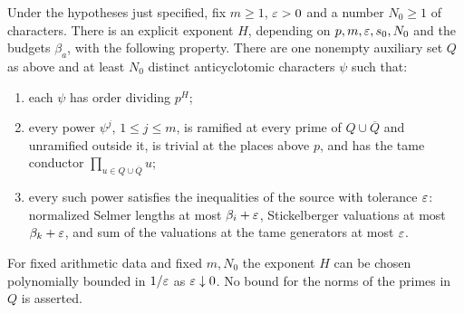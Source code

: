\begin{theorem}\label{tors:thm:arith}
Under the hypotheses just specified, fix $m\ge1$, $\varepsilon>0$ and a number $N_0\ge1$ of
characters. There is an explicit exponent $H$, depending on $p,m,\varepsilon,s_0,N_0$ and the
budgets $\beta_a$, with the following property. There are one nonempty auxiliary set $Q$
as above and at least $N_0$ distinct anticyclotomic characters $\psi$ such that:
\begin{enumerate}[label=\textup{(\roman*)}]
\item each $\psi$ has order dividing $p^H$;
\item every power $\psi^j$, $1\le j\le m$, is ramified at every prime of
  $Q\cup\overline Q$ and unramified outside it, is trivial at the places above $p$, and
  has the tame conductor $\prod_{u\in Q\cup\overline Q}u$;
\item every such power satisfies the  inequalities of the source with
  tolerance $\varepsilon$: normalized Selmer lengths at most $\beta_i+\varepsilon$, Stickelberger
  valuations at most $\beta_k+\varepsilon$, and sum of the valuations at the tame generators at
  most $\varepsilon$.
\end{enumerate}
For fixed arithmetic data and fixed $m,N_0$ the exponent $H$ can be chosen polynomially
bounded in $1/\varepsilon$ as $\varepsilon\downarrow0$. No bound for the norms of the primes in $Q$ is
asserted.
\end{theorem}

